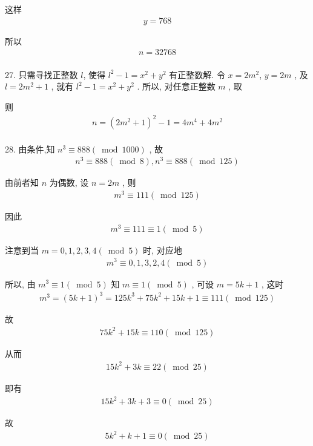 这样
\begin{align*}
	y=768
\end{align*}

所以
\begin{align*}
	n=32768
\end{align*}\\
27. 只需寻找正整数 $l$, 使得 $l^{2}-1=x^{2}+y^{2}$ 有正整数解. 令 $x=2 m^{2}$, $y=2 m$ , 及 $l=2 m^{2}+1$ , 就有 $l^{2}-1=x^{2}+y^{2}$ . 所以, 对任意正整数 $m$ , 取

则
\begin{align*}
	n=\left(2 m^{2}+1\right)^{2}-1=4 m^{4}+4 m^{2}
\end{align*}\\
28. 由条件,知 $n^{3} \equiv 888(\bmod 1000)$ , 故
\begin{align*}
	n^{3} \equiv 888(\bmod 8), n^{3} \equiv 888(\bmod 125)
\end{align*}

由前者知 $n$ 为偶数, 设 $n=2 m$ , 则
\begin{align*}
	m^{3} \equiv 111(\bmod 125)
\end{align*}

因此
\begin{align*}
	m^{3} \equiv 111 \equiv 1(\bmod 5)
\end{align*}

注意到当 $m=0,1,2,3,4(\bmod 5)$ 时, 对应地
\begin{align*}
	m^{3} \equiv 0,1,3,2,4(\bmod 5)
\end{align*}

所以, 由 $m^{3} \equiv 1(\bmod 5)$ 知 $m \equiv 1(\bmod 5)$ , 可设 $m=5 k+1$ , 这时
\begin{align*}
	m^{3}=(5 k+1)^{3}=125 k^{3}+75 k^{2}+15 k+1 \equiv 111(\bmod 125)
\end{align*}

故
\begin{align*}
	75 k^{2}+15 k \equiv 110(\bmod 125)
\end{align*}

从而
\begin{align*}
	15 k^{2}+3 k \equiv 22(\bmod 25)
\end{align*}

即有
\begin{align*}
	15 k^{2}+3 k+3 \equiv 0(\bmod 25)
\end{align*}

故
\begin{align*}
	5 k^{2}+k+1 \equiv 0(\bmod 25)
\end{align*}

